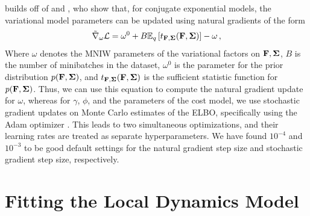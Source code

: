 \citet{Johnson2016} builds off of \citet{Hoffman2013} and \citet{Winn2005}, who show that, for conjugate exponential models, the variational model parameters can be updated using natural gradients of the form
\begin{equation}
    \tilde{\nabla}_{\omega}\mathcal{L}=\omega^0+B\mathbb{E}_q\left[t_{\mathbf{F},\bm{\Sigma}}(\mathbf{F},\bm{\Sigma})\right]-\omega\,,
\end{equation}
Where $\omega$ denotes the MNIW parameters of the variational factors on $\mathbf{F},\bm{\Sigma}$, $B$ is the number of minibatches in the dataset, $\omega^0$ is the parameter for the prior distribution $p(\mathbf{F},\bm{\Sigma})$, and $t_{\mathbf{F},\bm{\Sigma}}(\mathbf{F},\bm{\Sigma})$ is the sufficient statistic function for $p(\mathbf{F},\bm{\Sigma})$. Thus, we can use this equation to compute the natural gradient update for $\omega$, whereas for $\gamma$, $\phi$, and the parameters of the cost model, we use stochastic gradient updates on Monte Carlo estimates of the ELBO, specifically using the Adam optimizer \citep{Kingma2014}. This leads to two simultaneous optimizations, and their learning rates are treated as separate hyperparameters. We have found $10^{-4}$ and $10^{-3}$ to be good default settings for the natural gradient step size and stochastic gradient step size, respectively.


\section{Fitting the Local Dynamics Model}
\label{sec:supp-fit}

